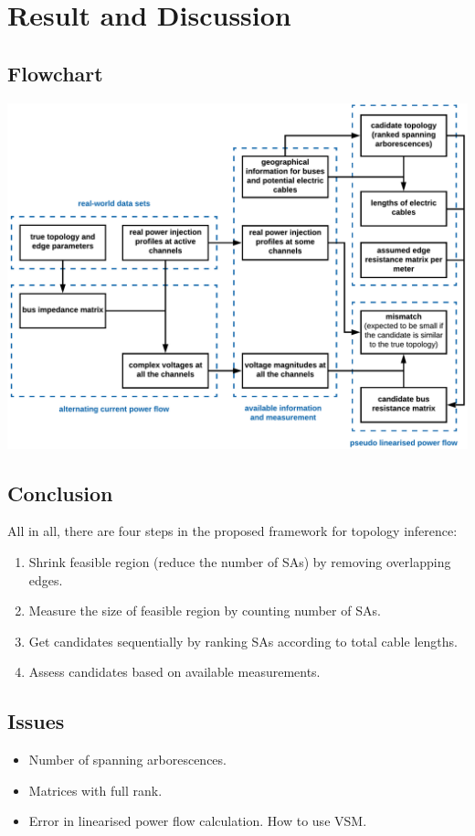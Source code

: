 \documentclass[
]{book}
\providecommand{\tightlist}{%
  \setlength{\itemsep}{0pt}\setlength{\parskip}{0pt}}
\begin{document}
\hypertarget{result-and-discussion}{%
\chapter{Result and Discussion}\label{result-and-discussion}}

\hypertarget{flowchart}{%
\section{Flowchart}\label{flowchart}}

\includegraphics{Pictures/figFlowchartRotate.png}

\hypertarget{conclusion}{%
\section{Conclusion}\label{conclusion}}

All in all, there are four steps in the proposed framework for topology inference:

\begin{enumerate}
\def\labelenumi{\arabic{enumi}.}
\tightlist
\item
  Shrink feasible region (reduce the number of SAs) by removing overlapping
  edges.
\item
  Measure the size of feasible region by counting number of SAs.
\item
  Get candidates sequentially by ranking SAs according to total cable lengths.
\item
  Assess candidates based on available measurements.
\end{enumerate}

\hypertarget{issues}{%
\section{Issues}\label{issues}}

\begin{itemize}
\tightlist
\item
  Number of spanning arborescences.
\item
  Matrices with full rank.
\item
  Error in linearised power flow calculation. How to use VSM.
\end{itemize}

  
\end{document}
